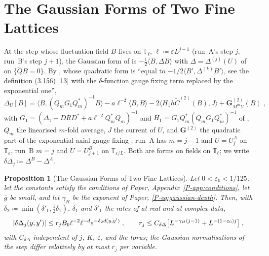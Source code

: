 \documentclass[11pt]{preprint}
\DeclarePairedDelimiter{\abs}{\lvert}{\rvert}
\numberwithin{equation}{section}
\newtheorem{proposition}{Proposition}
\theoremstyle{definition}
\theoremstyle{remark}
\theoremstyle{plain}
\begin{document}
\section{The Gaussian Forms of Two Fine Lattices}\label{sec:gaussian-depth}

At the step whose fluctuation field $B$ lives on $\mathbb T_\ell$, $\ell \coloneqq \varepsilon L^{j-1}$ (run~A's step $j$, run~B's step $j + 1$), the Gaussian form of \cite[(3.15)]{BalabanCRE} is $-\frac12\langle B, \Delta B\rangle$ with $\Delta = \Delta^{(j)}(U)$ of \cite[(1.4)--(1.5)]{BalabanRG1} on $\{\tilde QB = 0\}$. By \cite[p.~267, ll.~38--39]{BalabanRG1}, whose quadratic form is ``equal to $-1/2\langle B', \Delta^{(k)}B'\rangle$, see the definition (3.156) [13] with the $\delta$-function gauge fixing term replaced by the exponential one'',
\begin{equation}\label{eq:gaussian-form}
    \Delta_U[B] = \langle B, (Q_mG_1Q_m^*)^{-1}B\rangle - a\ell^{-2}\langle B, B\rangle - 2\langle H_1h\tilde C^{(2)}(B), J\rangle + \mathbf G^{(2)}_{M^mU}(B)\;,
\end{equation}
with $G_1 = (\Delta_1 + DRD^* + a\ell^{-2}Q_m^*Q_m)^{-1}$ and $H_1 = G_1Q_m^*(Q_mG_1Q_m^*)^{-1}$ of \cite[(3.128)--(3.129)]{BalabanPBG}, $Q_m$ the linearised $m$-fold average, $J$ the current of $U$, and $\mathbf G^{(2)}$ the quadratic part of the exponential axial gauge fixing \cite[(2.5), (2.11)]{BalabanRG1}; run~A has $m = j - 1$ and $U = U^A_j$ on $\mathbb T_\varepsilon$, run~B $m = j$ and $U = U^B_{j+1}$ on $\mathbb T_{\varepsilon/L}$. Both are forms on fields on $\mathbb T_\ell$; we write $\delta\Delta_j \coloneqq \Delta^B - \Delta^A$.

\begin{proposition}[The Gaussian Forms of Two Fine Lattices]\label{prop:gaussian-depth}
Let $0 < \varepsilon_0 < 1/125$, let the constants satisfy the conditions of Paper, Appendix~\ref{P-app:conditions}, let $\bar g$ be small, and let $\gamma_H$ be the exponent of Paper, \eqref{P-eq:gaussian-depth}. Then, with $\delta_2 \coloneqq \min(\delta'_1, \frac12\delta_1)$, $\delta_1$ and $\delta'_1$ the rates of \cite[(3.132)]{BalabanPBG} at real and at complex data,
\begin{equation}\label{eq:gaussian-depth-supp}
    \abs{\delta\Delta_j(y, y')} \leq r_jB_0\ell^{-2}\ell^{-d}e^{-\delta_2d(y,y')}\;,
    \qquad
    r_j \leq C_{\delta\Delta}\bigl[L^{-\gamma_H(j-1)} + L^{-(1-\varepsilon_0)j}\bigr]\;,
\end{equation}
with $C_{\delta\Delta}$ independent of $j$, $K$, $\varepsilon$, and the torus; the Gaussian normalisations of the step differ relatively by at most $r_j$ per variable.
\end{proposition}
\end{document}
